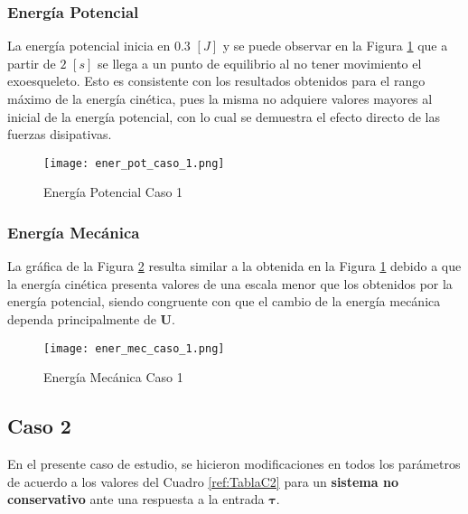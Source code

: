     \subsubsection{Energía Potencial}
    \noindent La energía potencial inicia en $0.3$ $[J]$ y se puede observar en la Figura 
    \ref{fig:ePotC1} que a partir de $2$ $[s]$ se llega a un punto de equilibrio al no tener 
    movimiento el exoesqueleto. Esto es consistente con los resultados obtenidos para 
    el rango máximo de la energía cinética, pues la misma no adquiere valores mayores al 
    inicial de la energía potencial, con lo cual se demuestra el efecto directo de las 
    fuerzas disipativas.

    \begin{figure} [H]%
            \centering
            \texttt{[image: ener\_pot\_caso\_1.png]} 
        \caption{Energía Potencial Caso 1}
        \label{fig:ePotC1}
    \end{figure}

    \subsubsection{Energía Mecánica}
    \noindent La gráfica de la Figura \ref{fig:eMecC1} resulta similar a la obtenida en la Figura \ref{fig:ePotC1} 
    debido a que la energía cinética presenta valores de una escala menor que los 
    obtenidos por la energía potencial, siendo congruente con que el cambio de la energía
    mecánica dependa principalmente de $\boldsymbol{U}$.

    \begin{figure} [H]%
            \centering
            \texttt{[image: ener\_mec\_caso\_1.png]} 
        \caption{Energía Mecánica Caso 1}
        \label{fig:eMecC1}
    \end{figure}

\subsection{Caso 2}\label{caso2}
    \noindent En el presente caso de estudio, se hicieron modificaciones en todos los 
    parámetros de acuerdo a los valores del Cuadro \ref{ref:TablaC2} para un 
    \textbf{sistema no conservativo} ante una respuesta a la entrada $\boldsymbol{\tau}$.

